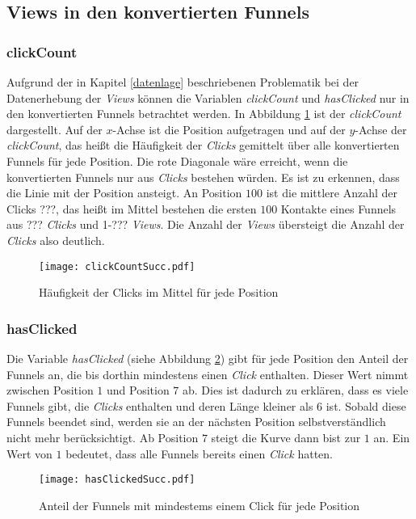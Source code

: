 \subsection{Views in den konvertierten Funnels}\label{plotsViews}

\subsubsection*{clickCount}
Aufgrund der in Kapitel \ref{datenlage} beschriebenen Problematik bei der Datenerhebung der \textit{Views} können die Variablen \textit{clickCount} und \textit{hasClicked} nur in den konvertierten Funnels betrachtet werden. In Abbildung \ref{clickCount} ist der \textit{clickCount} dargestellt. Auf der $x$-Achse ist die Position aufgetragen und auf der $y$-Achse der \textit{clickCount}, das heißt die Häufigkeit der \textit{Clicks} gemittelt über alle konvertierten Funnels für jede Position. Die rote Diagonale wäre erreicht, wenn die konvertierten Funnels nur aus \textit{Clicks} bestehen würden. Es ist zu erkennen, dass die Linie mit der Position ansteigt. An Position $100$ ist die mittlere Anzahl der Clicks ???, das heißt im Mittel bestehen die ersten $100$ Kontakte eines Funnels aus ??? \textit{Clicks} und 1-??? \textit{Views}. Die Anzahl der \textit{Views} übersteigt die Anzahl der \textit{Clicks} also deutlich.
\begin{figure}[H]
    \centering
    \texttt{[image: clickCountSucc.pdf]}
    \caption{Häufigkeit der Clicks im Mittel für jede Position}
    \label{clickCount}
\end{figure}

\subsubsection*{hasClicked}
Die Variable \textit{hasClicked} (siehe Abbildung \ref{hasClicked}) gibt für jede Position den Anteil der Funnels an, die bis dorthin mindestens einen \textit{Click} enthalten. Dieser Wert nimmt zwischen Position $1$ und Position $7$ ab. Dies ist dadurch zu erklären, dass es viele Funnels gibt, die \textit{Clicks} enthalten und deren Länge kleiner als $6$ ist. Sobald diese Funnels beendet sind, werden sie an der nächsten Position selbstverständlich nicht mehr berücksichtigt. Ab Position $7$ steigt die Kurve dann bist zur $1$ an. Ein Wert von $1$ bedeutet, dass alle Funnels bereits einen \textit{Click} hatten.
\begin{figure}[H]
    \centering
    \texttt{[image: hasClickedSucc.pdf]}
    \caption{Anteil der Funnels mit mindestems einem Click für jede Position}
    \label{hasClicked}
\end{figure}

